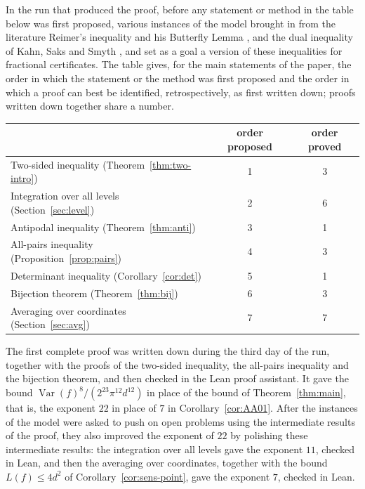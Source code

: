 \documentclass[11pt,reqno]{amsart}
\theoremstyle{definition}
\theoremstyle{remark}
\numberwithin{equation}{section}
\theoremstyle{named}
\theoremstyle{plain}
\newcommand{\Var}{\operatorname{Var}}
\begin{document}
In the run that produced the proof, before any statement or method in the table below was first
proposed, various instances of the model brought in
from the literature Reimer's inequality and his Butterfly Lemma \cite{Rei}, and the dual inequality of
Kahn, Saks and Smyth \cite{KSS}, and set as a goal a version of these inequalities for fractional
certificates.
The table gives, for the main statements of the paper, the order in which the statement or the method
was first proposed and the order in which a proof can best be identified, retrospectively, as first
written down; proofs written down together share a number.
\begin{center}
\small
\begin{tabular}{lcc}
\hline
 & order proposed & order proved\\
\hline
Two-sided inequality (Theorem~\ref{thm:two-intro}) & 1 & 3\\
Integration over all levels (Section~\ref{sec:level}) & 2 & 6\\
Antipodal inequality (Theorem~\ref{thm:anti}) & 3 & 1\\
All-pairs inequality (Proposition~\ref{prop:pairs}) & 4 & 3\\
Determinant inequality (Corollary~\ref{cor:det}) & 5 & 1\\
Bijection theorem (Theorem~\ref{thm:bij}) & 6 & 3\\
Averaging over coordinates (Section~\ref{sec:avg}) & 7 & 7\\
\hline
\end{tabular}
\end{center}

The first complete proof was written down during the third day of the run, together with the proofs of the two-sided
inequality, the all-pairs inequality and the bijection theorem, and then checked in the Lean proof
assistant. It gave the bound $\Var(f)^{8}/(2^{23}\pi^{12}d^{12})$ in place of the
bound of Theorem~\ref{thm:main}, that is, the exponent $22$ in place of $7$ in
Corollary~\ref{cor:AA01}. After the instances of the model were asked to push on open problems using
the intermediate results of the proof, they also improved the exponent of $22$ by polishing these
intermediate results: the integration over all levels gave the exponent $11$, checked in Lean, and then the averaging over coordinates,
together with the bound $L(f)\le4d^{2}$ of Corollary~\ref{cor:sens-point}, gave the exponent $7$,
checked in Lean.
\end{document}
